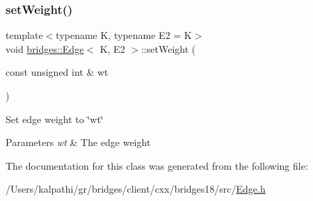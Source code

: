 \subsubsection{\texorpdfstring{set\+Weight()}{setWeight()}}
{\footnotesize\ttfamily template$<$typename K, typename E2 = K$>$ \\
void \mbox{\hyperlink{classbridges_1_1_edge}{bridges\+::\+Edge}}$<$ K, E2 $>$\+::set\+Weight (\begin{DoxyParamCaption}\item[{const unsigned int \&}]{wt }\end{DoxyParamCaption})\hspace{0.3cm}{\ttfamily [inline]}}

Set edge weight to \char`\"{}wt\char`\"{}


\begin{DoxyParams}{Parameters}
{\em wt} & The edge weight \\
\hline
\end{DoxyParams}


The documentation for this class was generated from the following file\+:\begin{DoxyCompactItemize}
\item 
/\+Users/kalpathi/gr/bridges/client/cxx/bridges18/src/\mbox{\hyperlink{_edge_8h}{Edge.\+h}}\end{DoxyCompactItemize}

